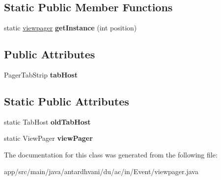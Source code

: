 \subsection*{Static Public Member Functions}
\begin{DoxyCompactItemize}
\item 
\hypertarget{classantardhvani_1_1du_1_1ac_1_1in_1_1_event_1_1viewpager_a75014da637297ebaf2eb148f99dfd3d2}{}static \hyperlink{classantardhvani_1_1du_1_1ac_1_1in_1_1_event_1_1viewpager}{viewpager} {\bfseries get\+Instance} (int position)\label{classantardhvani_1_1du_1_1ac_1_1in_1_1_event_1_1viewpager_a75014da637297ebaf2eb148f99dfd3d2}

\end{DoxyCompactItemize}
\subsection*{Public Attributes}
\begin{DoxyCompactItemize}
\item 
\hypertarget{classantardhvani_1_1du_1_1ac_1_1in_1_1_event_1_1viewpager_a0ef1d3006f6c5bb16d514f206ae9bdf1}{}Pager\+Tab\+Strip {\bfseries tab\+Host}\label{classantardhvani_1_1du_1_1ac_1_1in_1_1_event_1_1viewpager_a0ef1d3006f6c5bb16d514f206ae9bdf1}

\end{DoxyCompactItemize}
\subsection*{Static Public Attributes}
\begin{DoxyCompactItemize}
\item 
\hypertarget{classantardhvani_1_1du_1_1ac_1_1in_1_1_event_1_1viewpager_adc87a91e25558cda82f59a1079b9f76b}{}static Tab\+Host {\bfseries old\+Tab\+Host}\label{classantardhvani_1_1du_1_1ac_1_1in_1_1_event_1_1viewpager_adc87a91e25558cda82f59a1079b9f76b}

\item 
\hypertarget{classantardhvani_1_1du_1_1ac_1_1in_1_1_event_1_1viewpager_a5a05220e091321a5ed3c40e1b03eb047}{}static View\+Pager {\bfseries view\+Pager}\label{classantardhvani_1_1du_1_1ac_1_1in_1_1_event_1_1viewpager_a5a05220e091321a5ed3c40e1b03eb047}

\end{DoxyCompactItemize}


The documentation for this class was generated from the following file\+:\begin{DoxyCompactItemize}
\item 
app/src/main/java/antardhvani/du/ac/in/\+Event/viewpager.\+java\end{DoxyCompactItemize}
